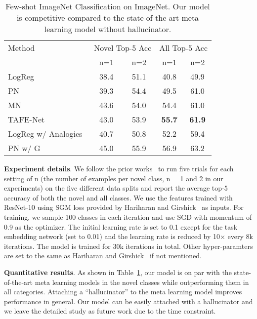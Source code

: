 \documentclass[10pt,twocolumn,letterpaper]{article}
\newcommand{\model}{TAFE-Net\xspace}
\newcommand\minisection[1]{\vspace{2mm}\noindent \textbf{#1}}
\begin{document}
\begin{table}[t]
\centering
\small
\caption{Few-shot ImageNet Classification on ImageNet. Our model
is competitive compared to the state-of-the-art meta learning model
without hallucinator.}
\label{tab:few-shot}
\begin{tabular}{@{}l|cc|cc@{}}
\toprule
Method & \multicolumn{2}{c}{Novel Top-5 Acc} & \multicolumn{2}{|c}{All Top-5 Acc} \\
 & n=1 & n=2  & n=1 & n=2  \\ 
 \midrule
LogReg ~\cite{hariharan2017low} & 38.4 & 51.1  & 40.8 & 49.9 \\
PN~\cite{snell2017prototypical} & 39.3 & 54.4  &  49.5 & 61.0 \\
MN~\cite{vinyals2016matching} &  43.6 & 54.0  &  54.4 & 61.0  \\
\midrule
\model & 43.0 & 53.9 & \textbf{55.7} & \textbf{61.9} \\
\midrule\midrule
LogReg w/ Analogies~\cite{hariharan2017low} & 40.7 & 50.8 & 52.2 & 59.4 \\
PN w/ G ~\cite{wang2018low} & 45.0 & 55.9 & 56.9 & 63.2 \\ 
\bottomrule
\end{tabular}%
\vspace{-1em}
\end{table}\minisection{Experiment details}. We follow the prior works~\cite{hariharan2017low, wang2018low} to run five trials for each setting of n (the number of examples per
novel class, n = 1 and 2 in our experiments) on the five different data splits and report the average top-5 accuracy of both
the novel and all classes. We use the features trained with ResNet-10 using SGM
loss provided by Hariharan and Girshick~\cite{hariharan2017low} as inputs. 
For training, we sample 100
classes in each iteration and use SGD with momentum of 0.9 as the optimizer. The
initial learning rate is set to 0.1 except for the task embedding network (set to
0.01) and the learning rate is reduced by 10$\times$ every 8k iterations.
The model is trained for 
30k iterations in total. Other hyper-paramters are set to the same as Hariharan and Girshick~\cite{hariharan2017low} if not mentioned.

\minisection{Quantitative results}. As shown in Table~\ref{tab:few-shot}, our
model is on par with the state-of-the-art meta learning models in the 
novel classes while outperforming them in all categories. Attaching a ``hallucinator'' to the meta learning model improves performance in
general. Our model can be easily attached with a hallucinator and we leave
the detailed study as future work due to the time constraint. 
\end{document}
